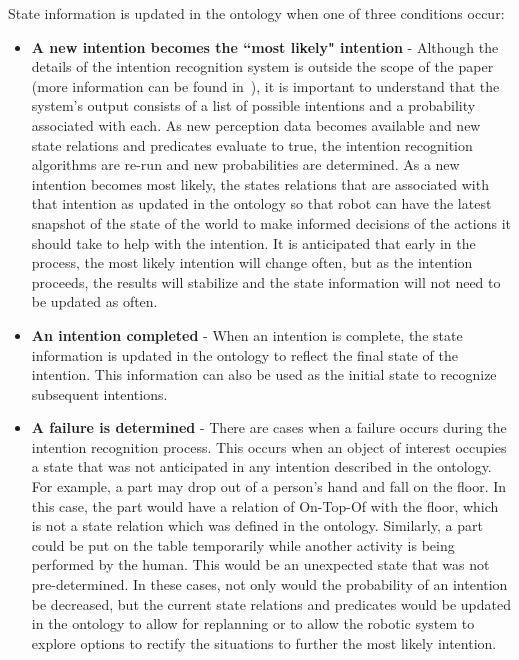 \documentclass[final,1p,times]{elsarticle}
\begin{document}
State information is updated in the ontology when one of three conditions occur:

\begin{itemize}
\item \textbf{A new intention becomes the ``most likely" intention} - Although the details of the intention recognition system is outside the scope of the paper (more information can be found in~\cite{SCHLENOFF.ECDRM.2012}), it is important to understand that the system's output consists of a list of possible intentions and a probability associated with each. As new perception data becomes available and new state relations and predicates evaluate to true, the intention recognition algorithms are re-run and new probabilities are determined. As a new intention becomes most likely, the states relations that are associated with that intention as updated in the ontology so that robot can have the latest snapshot of the state of the world to make informed decisions of the actions it should take to help with the intention. It is anticipated that early in the process, the most likely intention will change often, but as the intention proceeds, the results will stabilize and the state information will not need to be updated as often.
\item \textbf{An intention completed} - When an intention is complete, the state information is updated in the ontology to reflect the final state of the intention. This information can also be used as the initial state to recognize subsequent intentions.
\item \textbf{A failure is determined} - There are cases when a failure occurs during the intention recognition process. This occurs when an object of interest occupies a state that was not anticipated in any intention described in the ontology. For example, a part may drop out of a person's hand and fall on the floor. In this case, the part would have a relation of On-Top-Of with the floor, which is not a state relation which was defined in the ontology. Similarly, a part could be put on the table temporarily while another activity is being performed by the human. This would be an unexpected state that was not pre-determined. In these cases, not only would the probability of an intention be decreased, but the current state relations and predicates would be updated in the ontology to allow for replanning or to allow the robotic system to explore options to rectify the situations to further the most likely intention.
\end{itemize}
\end{document}
